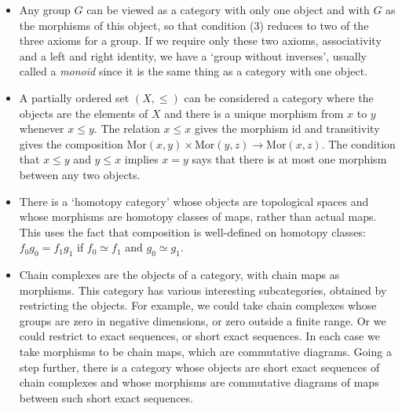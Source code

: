 \begin{itemize}
\item Any group $G$ can be viewed as a category with only one object and with $G$ as the morphisms of this object, so that condition (3) reduces to two of the three axioms for a group. If we require only these two axioms, associativity and a left and right identity, we have a `group without inverses', usually called a \emph{monoid} since it is the same thing as a category with one object.

\item A partially ordered set $(X, \le)$ can be considered a category where the objects are the elements of $X$ and there is a unique morphism from $x$ to $y$ whenever $x \le y$. The relation $x \le x$ gives the morphism $\mathrm{id}$ and transitivity gives the composition $\mathrm{Mor}(x,y) \times \mathrm{Mor}(y,z) \to \mathrm{Mor}(x,z)$. The condition that $x \le y$ and $y \le x$ implies $x = y$ says that there is at most one morphism between any two objects.

\item There is a `homotopy category' whose objects are topological spaces and whose morphisms are homotopy classes of maps, rather than actual maps. This uses the fact that composition is well-defined on homotopy classes: $f_0 g_0 = f_1 g_1$ if $f_0 \simeq f_1$ and $g_0 \simeq g_1$.

\item Chain complexes are the objects of a category, with chain maps as morphisms. This category has various interesting subcategories, obtained by restricting the objects. For example, we could take chain complexes whose groups are zero in negative dimensions, or zero outside a finite range. Or we could restrict to exact sequences, or short exact sequences. In each case we take morphisms to be chain maps, which are commutative diagrams. Going a step further, there is a category whose objects are short exact sequences of chain complexes and whose morphisms are commutative diagrams of maps between such short exact sequences.
\end{itemize}


